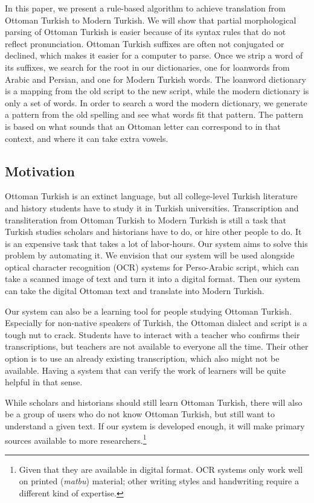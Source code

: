 \documentclass[10pt,twocolumn]{article}
\theoremstyle{nonumberplain}
\begin{document}
In this paper, we present a rule-based algorithm to achieve translation from
Ottoman Turkish to Modern Turkish.  We will show that partial morphological
parsing of Ottoman Turkish is easier because of its syntax rules that do not
reflect pronunciation. Ottoman Turkish suffixes are often not conjugated or
declined, which makes it easier for a computer to parse.
Once we strip a word of its suffixes, we search for the root in our
dictionaries, one for loanwords from Arabic and Persian, and one for Modern
Turkish words. The loanword dictionary is a mapping
from the old script to the new script, while the modern dictionary is only a
set of words. In order to search a word the modern dictionary, we generate a
pattern from the old spelling and see what words fit that pattern.
The pattern is based on what sounds that an Ottoman letter can correspond to in
that context, and where it can take extra vowels.

\subsection{Motivation}

Ottoman Turkish is an extinct language, but all college-level Turkish
literature and history students have to study it in Turkish universities.
Transcription and transliteration from Ottoman Turkish to Modern Turkish is
still a task that Turkish studies scholars and historians have to do, or hire
other people to do. It is an expensive task that takes a lot of labor-hours.
Our system aims to solve this problem by automating it.
We envision that our system will be used alongside optical character
recognition (OCR) systems for Perso-Arabic script, which can take a scanned image of
text and turn it into a digital format.
Then our system can take the digital Ottoman text and translate into Modern Turkish.

Our system can also be a learning tool for people studying Ottoman Turkish.
Especially for non-native speakers of Turkish, the Ottoman dialect and script
is a tough nut to crack. Students have to interact with a teacher who confirms
their transcriptions, but teachers are not available to everyone all the time.
Their other option is to use an already existing transcription, which also might not be available.
Having a system that can verify the work of learners will be quite helpful in that sense.

While scholars and historians should still learn Ottoman Turkish, there will
also be a group of users who do not know Ottoman Turkish, but still want to
understand a given text. If our system is developed enough, it will make
primary sources available to more researchers.\footnote{Given that they are
available in digital format. OCR systems only work well on printed
(\emph{matbu}) material; other writing styles and handwriting require a
different kind of expertise.}
\end{document}
